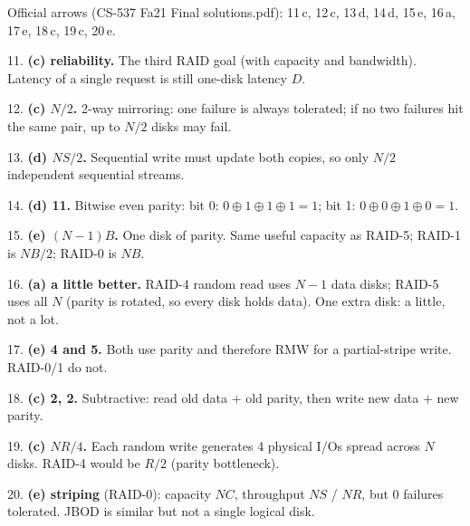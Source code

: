 \documentclass[11pt,a4paper]{article}
\newenvironment{Sol}{%
  \begin{tcolorbox}[sboxstyle, title={Solution}]%
}{%
  \end{tcolorbox}\vspace{0.35em}%
}
\begin{document}
\begin{Sol}
Official arrows (CS-537 Fa21 Final solutions.pdf):
11\,c, 12\,c, 13\,d, 14\,d, 15\,e, 16\,a, 17\,e, 18\,c, 19\,c, 20\,e.

11. \textbf{(c) reliability.} The third RAID goal (with capacity and
bandwidth). Latency of a single request is still one-disk latency $D$.

12. \textbf{(c) $N/2$.} 2-way mirroring: one failure is always
tolerated; if no two failures hit the same pair, up to $N/2$ disks may
fail.

13. \textbf{(d) $NS/2$.} Sequential write must update both copies, so
only $N/2$ independent sequential streams.

14. \textbf{(d) 11.} Bitwise even parity:
bit 0: $0\oplus 1\oplus 1\oplus 1 = 1$;
bit 1: $0\oplus 0\oplus 1\oplus 0 = 1$.

15. \textbf{(e) $(N-1)B$.} One disk of parity. Same useful capacity as
RAID-5; RAID-1 is $NB/2$; RAID-0 is $NB$.

16. \textbf{(a) a little better.} RAID-4 random read uses $N-1$ data
disks; RAID-5 uses all $N$ (parity is rotated, so every disk holds
data). One extra disk: a little, not a lot.

17. \textbf{(e) 4 and 5.} Both use parity and therefore RMW for a
partial-stripe write. RAID-0/1 do not.

18. \textbf{(c) 2, 2.} Subtractive: read old data $+$ old parity, then
write new data $+$ new parity.

19. \textbf{(c) $NR/4$.} Each random write generates 4 physical I/Os
spread across $N$ disks. RAID-4 would be $R/2$ (parity bottleneck).

20. \textbf{(e) striping} (RAID-0): capacity $NC$, throughput $NS$ /
$NR$, but 0 failures tolerated. JBOD is similar but not a single
logical disk.
\end{Sol}
\end{document}
